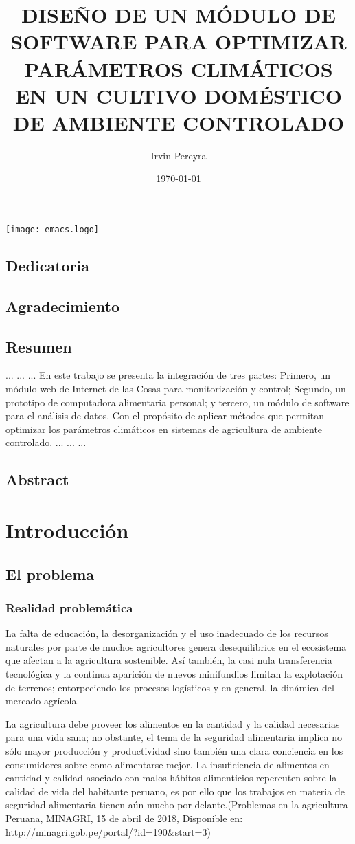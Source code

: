 \documentclass{report}
\title{DISEÑO DE UN MÓDULO DE SOFTWARE PARA OPTIMIZAR PARÁMETROS CLIMÁTICOS EN
  UN CULTIVO DOMÉSTICO DE AMBIENTE CONTROLADO}
\author{Irvin Pereyra}
\date{\today}
\begin{document}
\maketitle
\texttt{[image: emacs.logo]}
\section{Dedicatoria}
\section{Agradecimiento}
\tableofcontents
\newpage
{}
\section{Resumen}
...
...
...
En este trabajo se presenta la integración de tres partes: Primero, un
módulo web de Internet de las Cosas para monitorización y control; Segundo, un
prototipo de computadora alimentaria personal; y tercero, un módulo de software
para el análisis de datos. Con el propósito de aplicar métodos que permitan
optimizar los parámetros climáticos en sistemas de agricultura de ambiente
controlado.
...
...
...
\section{Abstract}

\chapter{Introducción}
\section{El problema}
\subsection{Realidad problemática}
La falta de educación, la desorganización y el uso inadecuado de los recursos
naturales por parte de muchos agricultores genera desequilibrios en el
ecosistema que afectan a la agricultura sostenible. Así también, la casi nula
transferencia tecnológica y la continua aparición de nuevos minifundios limitan
la explotación de terrenos; entorpeciendo los procesos logísticos y en general,
la dinámica del mercado agrícola.

La agricultura debe proveer los alimentos en la cantidad y la calidad necesarias
para una vida sana; no obstante, el tema de la seguridad alimentaria implica no
sólo mayor producción y productividad sino también una clara conciencia en los
consumidores sobre como alimentarse mejor. La insuficiencia de alimentos en
cantidad y calidad asociado con malos hábitos alimenticios repercuten sobre la
calidad de vida del habitante peruano, es por ello que los trabajos en materia
de seguridad alimentaria tienen aún mucho por delante.(Problemas en la
agricultura Peruana, MINAGRI, 15 de abril de 2018,  Disponible en:
http://minagri.gob.pe/portal/?id=190&start=3)
\end{document}
